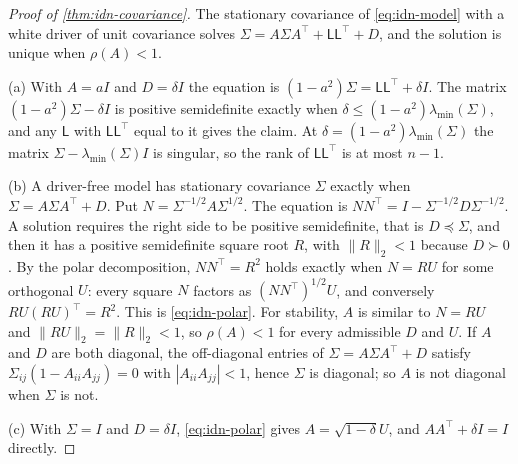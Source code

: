 \begin{proof}[Proof of \cref{thm:idn-covariance}]
The stationary covariance of \cref{eq:idn-model} with a white driver of unit covariance solves $\Sigma=A\Sigma A^{\top}+\mathsf L\mathsf L^{\top}+D$, and the solution is unique when $\rho(A)<1$.

(a) With $A=aI$ and $D=\delta I$ the equation is $(1-a^2)\Sigma=\mathsf L\mathsf L^{\top}+\delta I$. The matrix $(1-a^2)\Sigma-\delta I$ is positive semidefinite exactly when $\delta\le(1-a^2)\lambda_{\min}(\Sigma)$, and any $\mathsf L$ with $\mathsf L\mathsf L^{\top}$ equal to it gives the claim. At $\delta=(1-a^2)\lambda_{\min}(\Sigma)$ the matrix $\Sigma-\lambda_{\min}(\Sigma)I$ is singular, so the rank of $\mathsf L\mathsf L^{\top}$ is at most $n-1$.

(b) A driver-free model has stationary covariance $\Sigma$ exactly when $\Sigma=A\Sigma A^{\top}+D$. Put $N=\Sigma^{-1/2}A\Sigma^{1/2}$. The equation is $NN^{\top}=I-\Sigma^{-1/2}D\Sigma^{-1/2}$. A solution requires the right side to be positive semidefinite, that is $D\preceq\Sigma$, and then it has a positive semidefinite square root $R$, with $\lVert R\rVert_2<1$ because $D\succ0$. By the polar decomposition, $NN^{\top}=R^2$ holds exactly when $N=RU$ for some orthogonal $U$: every square $N$ factors as $(NN^{\top})^{1/2}U$, and conversely $RU(RU)^{\top}=R^2$. This is \cref{eq:idn-polar}. For stability, $A$ is similar to $N=RU$ and $\lVert RU\rVert_2=\lVert R\rVert_2<1$, so $\rho(A)<1$ for every admissible $D$ and $U$. If $A$ and $D$ are both diagonal, the off-diagonal entries of $\Sigma=A\Sigma A^{\top}+D$ satisfy $\Sigma_{ij}(1-A_{ii}A_{jj})=0$ with $|A_{ii}A_{jj}|<1$, hence $\Sigma$ is diagonal; so $A$ is not diagonal when $\Sigma$ is not.

(c) With $\Sigma=I$ and $D=\delta I$, \cref{eq:idn-polar} gives $A=\sqrt{1-\delta}U$, and $AA^{\top}+\delta I=I$ directly.
\end{proof}

